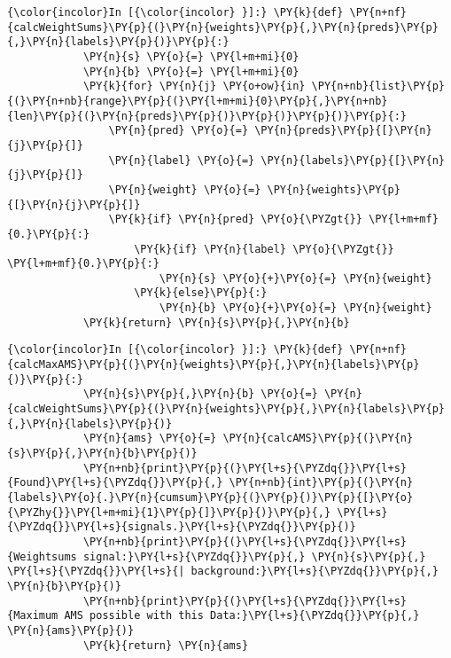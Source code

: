    \begin{Verbatim}[commandchars=\\\{\}]
{\color{incolor}In [{\color{incolor} }]:} \PY{k}{def} \PY{n+nf}{calcWeightSums}\PY{p}{(}\PY{n}{weights}\PY{p}{,}\PY{n}{preds}\PY{p}{,}\PY{n}{labels}\PY{p}{)}\PY{p}{:}
            \PY{n}{s} \PY{o}{=} \PY{l+m+mi}{0}
            \PY{n}{b} \PY{o}{=} \PY{l+m+mi}{0}
            \PY{k}{for} \PY{n}{j} \PY{o+ow}{in} \PY{n+nb}{list}\PY{p}{(}\PY{n+nb}{range}\PY{p}{(}\PY{l+m+mi}{0}\PY{p}{,}\PY{n+nb}{len}\PY{p}{(}\PY{n}{preds}\PY{p}{)}\PY{p}{)}\PY{p}{)}\PY{p}{:}
                \PY{n}{pred} \PY{o}{=} \PY{n}{preds}\PY{p}{[}\PY{n}{j}\PY{p}{]}
                \PY{n}{label} \PY{o}{=} \PY{n}{labels}\PY{p}{[}\PY{n}{j}\PY{p}{]}
                \PY{n}{weight} \PY{o}{=} \PY{n}{weights}\PY{p}{[}\PY{n}{j}\PY{p}{]}
                \PY{k}{if} \PY{n}{pred} \PY{o}{\PYZgt{}} \PY{l+m+mf}{0.}\PY{p}{:}
                    \PY{k}{if} \PY{n}{label} \PY{o}{\PYZgt{}} \PY{l+m+mf}{0.}\PY{p}{:}
                        \PY{n}{s} \PY{o}{+}\PY{o}{=} \PY{n}{weight}
                    \PY{k}{else}\PY{p}{:}
                        \PY{n}{b} \PY{o}{+}\PY{o}{=} \PY{n}{weight}
            \PY{k}{return} \PY{n}{s}\PY{p}{,}\PY{n}{b}
\end{Verbatim}

    \begin{Verbatim}[commandchars=\\\{\}]
{\color{incolor}In [{\color{incolor} }]:} \PY{k}{def} \PY{n+nf}{calcMaxAMS}\PY{p}{(}\PY{n}{weights}\PY{p}{,}\PY{n}{labels}\PY{p}{)}\PY{p}{:}
            \PY{n}{s}\PY{p}{,}\PY{n}{b} \PY{o}{=} \PY{n}{calcWeightSums}\PY{p}{(}\PY{n}{weights}\PY{p}{,}\PY{n}{labels}\PY{p}{,}\PY{n}{labels}\PY{p}{)}
            \PY{n}{ams} \PY{o}{=} \PY{n}{calcAMS}\PY{p}{(}\PY{n}{s}\PY{p}{,}\PY{n}{b}\PY{p}{)}
            \PY{n+nb}{print}\PY{p}{(}\PY{l+s}{\PYZdq{}}\PY{l+s}{Found}\PY{l+s}{\PYZdq{}}\PY{p}{,} \PY{n+nb}{int}\PY{p}{(}\PY{n}{labels}\PY{o}{.}\PY{n}{cumsum}\PY{p}{(}\PY{p}{)}\PY{p}{[}\PY{o}{\PYZhy{}}\PY{l+m+mi}{1}\PY{p}{]}\PY{p}{)}\PY{p}{,} \PY{l+s}{\PYZdq{}}\PY{l+s}{signals.}\PY{l+s}{\PYZdq{}}\PY{p}{)}
            \PY{n+nb}{print}\PY{p}{(}\PY{l+s}{\PYZdq{}}\PY{l+s}{Weightsums signal:}\PY{l+s}{\PYZdq{}}\PY{p}{,} \PY{n}{s}\PY{p}{,} \PY{l+s}{\PYZdq{}}\PY{l+s}{| background:}\PY{l+s}{\PYZdq{}}\PY{p}{,} \PY{n}{b}\PY{p}{)}
            \PY{n+nb}{print}\PY{p}{(}\PY{l+s}{\PYZdq{}}\PY{l+s}{Maximum AMS possible with this Data:}\PY{l+s}{\PYZdq{}}\PY{p}{,} \PY{n}{ams}\PY{p}{)}
            \PY{k}{return} \PY{n}{ams}
\end{Verbatim}

